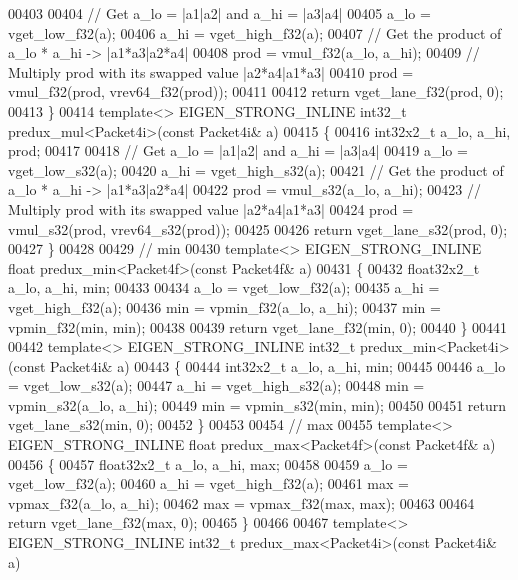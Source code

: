 \begin{DoxyCode}
{{00403 
00404   \textcolor{comment}{// Get a\_lo = |a1|a2| and a\_hi = |a3|a4|}
00405   a\_lo = vget\_low\_f32(a);
00406   a\_hi = vget\_high\_f32(a);
00407   \textcolor{comment}{// Get the product of a\_lo * a\_hi -> |a1*a3|a2*a4|}
00408   prod = vmul\_f32(a\_lo, a\_hi);
00409   \textcolor{comment}{// Multiply prod with its swapped value |a2*a4|a1*a3|}
00410   prod = vmul\_f32(prod, vrev64\_f32(prod));
00411 
00412   \textcolor{keywordflow}{return} vget\_lane\_f32(prod, 0);
00413 \}
00414 \textcolor{keyword}{template}<> EIGEN\_STRONG\_INLINE int32\_t predux\_mul<Packet4i>(\textcolor{keyword}{const} Packet4i& a)
00415 \{
00416   int32x2\_t a\_lo, a\_hi, prod;
00417 
00418   \textcolor{comment}{// Get a\_lo = |a1|a2| and a\_hi = |a3|a4|}
00419   a\_lo = vget\_low\_s32(a);
00420   a\_hi = vget\_high\_s32(a);
00421   \textcolor{comment}{// Get the product of a\_lo * a\_hi -> |a1*a3|a2*a4|}
00422   prod = vmul\_s32(a\_lo, a\_hi);
00423   \textcolor{comment}{// Multiply prod with its swapped value |a2*a4|a1*a3|}
00424   prod = vmul\_s32(prod, vrev64\_s32(prod));
00425 
00426   \textcolor{keywordflow}{return} vget\_lane\_s32(prod, 0);
00427 \}
00428 
00429 \textcolor{comment}{// min}
00430 \textcolor{keyword}{template}<> EIGEN\_STRONG\_INLINE \textcolor{keywordtype}{float} predux\_min<Packet4f>(\textcolor{keyword}{const} Packet4f& a)
00431 \{
00432   float32x2\_t a\_lo, a\_hi, min;
00433 
00434   a\_lo = vget\_low\_f32(a);
00435   a\_hi = vget\_high\_f32(a);
00436   min = vpmin\_f32(a\_lo, a\_hi);
00437   min = vpmin\_f32(min, min);
00438 
00439   \textcolor{keywordflow}{return} vget\_lane\_f32(min, 0);
00440 \}
00441 
00442 \textcolor{keyword}{template}<> EIGEN\_STRONG\_INLINE int32\_t predux\_min<Packet4i>(\textcolor{keyword}{const} Packet4i& a)
00443 \{
00444   int32x2\_t a\_lo, a\_hi, min;
00445 
00446   a\_lo = vget\_low\_s32(a);
00447   a\_hi = vget\_high\_s32(a);
00448   min = vpmin\_s32(a\_lo, a\_hi);
00449   min = vpmin\_s32(min, min);
00450   
00451   \textcolor{keywordflow}{return} vget\_lane\_s32(min, 0);
00452 \}
00453 
00454 \textcolor{comment}{// max}
00455 \textcolor{keyword}{template}<> EIGEN\_STRONG\_INLINE \textcolor{keywordtype}{float} predux\_max<Packet4f>(\textcolor{keyword}{const} Packet4f& a)
00456 \{
00457   float32x2\_t a\_lo, a\_hi, max;
00458 
00459   a\_lo = vget\_low\_f32(a);
00460   a\_hi = vget\_high\_f32(a);
00461   max = vpmax\_f32(a\_lo, a\_hi);
00462   max = vpmax\_f32(max, max);
00463 
00464   \textcolor{keywordflow}{return} vget\_lane\_f32(max, 0);
00465 \}
00466 
00467 \textcolor{keyword}{template}<> EIGEN\_STRONG\_INLINE int32\_t predux\_max<Packet4i>(\textcolor{keyword}{const} Packet4i& a)
}}
\end{DoxyCode}
